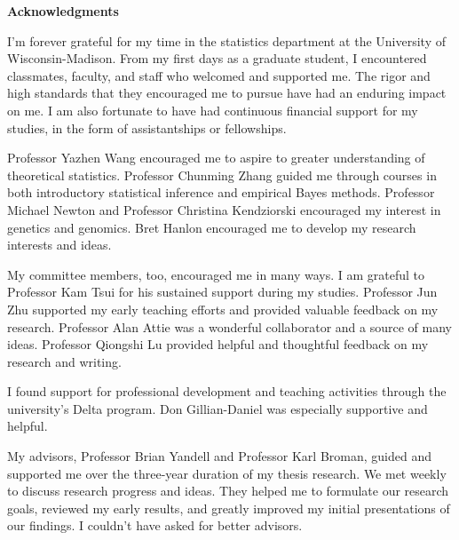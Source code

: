 \newenvironment{acknowledgements}%
    {\cleardoublepage\null\vfill\begin{center}%
    \bfseries Acknowledgments\end{center}}%
    {\vfill\null}
        \begin{acknowledgements}
I'm forever grateful for my time in the statistics department at the University of Wisconsin-Madison. From my first days as a graduate student, I encountered classmates, faculty, and staff who welcomed and supported me. The rigor and high standards that they encouraged me to pursue have had an enduring impact on me. I am also fortunate to have had continuous financial support for my studies, in the form of assistantships or fellowships. 

Professor Yazhen Wang encouraged me to aspire to greater understanding of theoretical statistics. Professor Chunming Zhang guided me through courses in both introductory statistical inference and empirical Bayes methods. Professor Michael Newton and Professor Christina Kendziorski encouraged my interest in genetics and genomics. Bret Hanlon encouraged me to develop my research interests and ideas. 

My committee members, too, encouraged me in many ways. I am grateful to Professor Kam Tsui for his sustained support during my studies. Professor Jun Zhu supported my early teaching efforts and provided valuable feedback on my research. Professor Alan Attie was a wonderful collaborator and a source of many ideas. Professor Qiongshi Lu provided helpful and thoughtful feedback on my research and writing.

I found support for professional development and teaching activities through the university's Delta program. Don Gillian-Daniel was especially supportive and helpful. 

My advisors, Professor Brian Yandell and Professor Karl Broman, guided and supported me over the three-year duration of my thesis research. We met weekly to discuss research progress and ideas. They helped me to formulate our research goals, reviewed my early results, and greatly improved my initial presentations of our findings. I couldn't have asked for better advisors.



\end{acknowledgements}